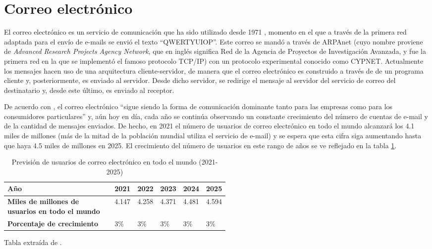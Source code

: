 \section{Correo electrónico}\label{s:email}
El correo electrónico \citep[Capítulo 11]{redhatemail} es un servicio de comunicación que ha sido utilizado desde 1971 \citep{wikiemail}, momento en el que a través de la primera red adaptada para el envío de e-mails se envió el texto ``QWERTYUIOP''. Este correo se mandó a través de ARPAnet (cuyo nombre proviene de \textit{Advanced Research Projects Agency Network}, que en inglés significa Red de la Agencia de Proyectos de Investigación Avanzada, y fue la primera red en la que se implementó el famoso protocolo TCP/IP) con un protocolo experimental conocido como CYPNET. Actualmente los mensajes hacen uso de una arquitectura cliente-servidor, de manera que el correo electrónico es construido a través de de un programa cliente y, posteriormente, es enviado al servidor. Desde dicho servidor, se redirige el mensaje al servidor del servicio de correo del destinatario y, desde este último, es enviado al receptor.

De acuerdo con \cite{radicati2020email}, el correo electrónico ``sigue siendo la forma de comunicación dominante tanto para las empresas como para los consumidores particulares'' y, aún hoy en día, cada año se continúa observando un constante crecimiento del número de cuentas de e-mail y de la cantidad de mensajes enviados. De hecho, en 2021 el número de usuarios de correo electrónico en todo el mundo alcanzará los 4.1 miles de millones (más de la mitad de la población mundial utiliza el servicio de e-mail) y se espera que esta cifra siga aumentando hasta que haya 4.5 miles de millones en 2025. El crecimiento del número de usuarios en este rango de años se ve reflejado en la tabla \ref{tab:emailusers}.

\begin{table}[h]
	\centering
	\begin{tabular}{|p{0.52\linewidth}|l|l|l|l|l|}
		\hline
		\textbf{Año} & 2021 & 2022 & 2023 & 2024 & 2025 \\ \hline
		\textbf{Miles de millones de usuarios en todo el mundo} & 4.147 & 4.258 & 4.371 & 4.481 & 4.594\\ \hline
		\textbf{Porcentaje de crecimiento} & 3\% & 3\% & 3\% & 3\% & 3\% \\ \hline
	\end{tabular}
	\caption{Previsión de usuarios de correo electrónico en todo el mundo (2021-2025)}\label{tab:emailusers}
	Tabla extraída de \cite{radicati2020email}.
\end{table}

